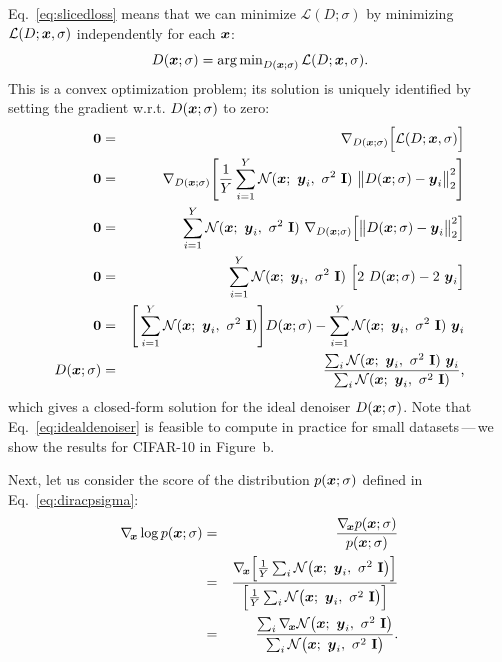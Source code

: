 Eq.~\ref{eq:slicedloss} means that we can minimize $\mathcal{L}(D; \sigma)$ by minimizing $\mathcal{L}(D; \boldsymbol{x}, \sigma)$ independently for each $\boldsymbol{x}$:
\begin{equation}
  D(\boldsymbol{x}; \sigma) = \operatorname{arg\,min}_{D(\boldsymbol{x}; \sigma)} \mathcal{L}(D; \boldsymbol{x}, \sigma)
  \text{.}
\end{equation}
This is a convex optimization problem; its solution is uniquely identified by setting the gradient w.r.t. $D(\boldsymbol{x}; \sigma)$ to zero:
\begin{eqnarray}
  \mathbf{0} &=& \nabla_{D(\boldsymbol{x}; \sigma)} \Big[ \mathcal{L}(D; \boldsymbol{x}, \sigma) \Big] \\
  \mathbf{0} &=& \nabla_{D(\boldsymbol{x}; \sigma)} \Bigg[ \frac{1}{Y} \sum_{i=1}^Y \mathcal{N}(\boldsymbol{x}; ~\boldsymbol{y}_i, ~\sigma^2 ~\mathbf{I}) ~\big\lVert D(\boldsymbol{x}; \sigma) - \boldsymbol{y}_i \big\rVert^2_2 \Bigg] \\
  \mathbf{0} &=& \sum_{i=1}^Y \mathcal{N}(\boldsymbol{x}; ~\boldsymbol{y}_i, ~\sigma^2 ~\mathbf{I}) ~\nabla_{D(\boldsymbol{x}; \sigma)} \Big[ \big\lVert D(\boldsymbol{x}; \sigma) - \boldsymbol{y}_i \big\rVert^2_2 \Big] \\
  \mathbf{0} &=& \sum_{i=1}^Y \mathcal{N}(\boldsymbol{x}; ~\boldsymbol{y}_i, ~\sigma^2 ~\mathbf{I}) ~\Big[ 2 ~D(\boldsymbol{x}; \sigma) - 2~\boldsymbol{y}_i \Big] \\
  \mathbf{0} &=& \Bigg[ \sum_{i=1}^Y \mathcal{N}(\boldsymbol{x}; ~\boldsymbol{y}_i, ~\sigma^2 ~\mathbf{I}) \Bigg] D(\boldsymbol{x}; \sigma) - \sum_{i=1}^Y \mathcal{N}(\boldsymbol{x}; ~\boldsymbol{y}_i, ~\sigma^2 ~\mathbf{I}) ~\boldsymbol{y}_i \\
  D(\boldsymbol{x}; \sigma) &=& \frac{ \sum_i \mathcal{N}(\boldsymbol{x}; ~\boldsymbol{y}_i, ~\sigma^2 ~\mathbf{I}) ~\boldsymbol{y}_i }{ \sum_i \mathcal{N}(\boldsymbol{x}; ~\boldsymbol{y}_i, ~\sigma^2 ~\mathbf{I}) }
  \label{eq:idealdenoiser}
  \text{,}
\end{eqnarray}
which gives a closed-form solution for the ideal denoiser $D(\boldsymbol{x}; \sigma)$.
Note that Eq.~\ref{eq:idealdenoiser} is feasible to compute in practice for small datasets\,---\,we show the results for CIFAR-10 in Figure~b.

Next, let us consider the score of the distribution $p(\boldsymbol{x}; \sigma)$ defined in Eq.~\ref{eq:diracpsigma}:
\begin{eqnarray}
  \nabla_{\hspace{-0.5mm}\boldsymbol{x}} \log p(\boldsymbol{x}; \sigma) &=& \frac{\nabla_{\hspace{-0.5mm}\boldsymbol{x}} p(\boldsymbol{x}; \sigma)}{p(\boldsymbol{x}; \sigma)} \\
  &=& \frac{ \nabla_{\hspace{-0.5mm}\boldsymbol{x}} \Big[ \frac{1}{Y} \sum_i \mathcal{N} \big( \boldsymbol{x}; ~\boldsymbol{y}_i, ~\sigma^2 ~\mathbf{I} \big) \Big] }{ \Big[ \frac{1}{Y} \sum_i \mathcal{N} \big( \boldsymbol{x}; ~\boldsymbol{y}_i, ~\sigma^2 ~\mathbf{I} \big) \Big] } \\
  &=& \frac{ \sum_i \nabla_{\hspace{-0.5mm}\boldsymbol{x}} \mathcal{N} \big( \boldsymbol{x}; ~\boldsymbol{y}_i, ~\sigma^2 ~\mathbf{I} \big) }{ \sum_i \mathcal{N} \big( \boldsymbol{x}; ~\boldsymbol{y}_i, ~\sigma^2 ~\mathbf{I} \big) }
  \label{eq:diracscoretemp}
  \text{.}
\end{eqnarray}

